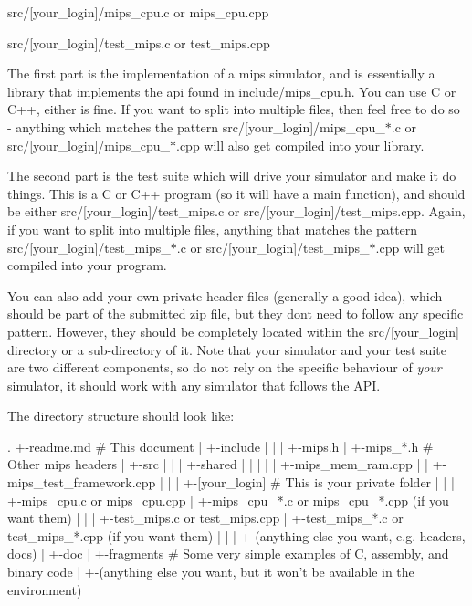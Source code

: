 \begin{DoxyItemize}
\item {\ttfamily src/\mbox{[}your\+\_\+login\mbox{]}/mips\+\_\+cpu.c} or {\ttfamily mips\+\_\+cpu.\+cpp}
\item {\ttfamily src/\mbox{[}your\+\_\+login\mbox{]}/test\+\_\+mips.c} or {\ttfamily test\+\_\+mips.\+cpp}
\end{DoxyItemize}

The first part is the implementation of a mips simulator, and is essentially a library that implements the api found in include/mips\+\_\+cpu.\+h. You can use C or C++, either is fine. If you want to split into multiple files, then feel free to do so -\/ anything which matches the pattern {\ttfamily src/\mbox{[}your\+\_\+login\mbox{]}/mips\+\_\+cpu\+\_\+$\ast$.c} or {\ttfamily src/\mbox{[}your\+\_\+login\mbox{]}/mips\+\_\+cpu\+\_\+$\ast$.cpp} will also get compiled into your library.

The second part is the test suite which will drive your simulator and make it do things. This is a C or C++ program (so it will have a main function), and should be either {\ttfamily src/\mbox{[}your\+\_\+login\mbox{]}/test\+\_\+mips.c} or {\ttfamily src/\mbox{[}your\+\_\+login\mbox{]}/test\+\_\+mips.cpp}. Again, if you want to split into multiple files, anything that matches the pattern {\ttfamily src/\mbox{[}your\+\_\+login\mbox{]}/test\+\_\+mips\+\_\+$\ast$.c} or {\ttfamily src/\mbox{[}your\+\_\+login\mbox{]}/test\+\_\+mips\+\_\+$\ast$.cpp} will get compiled into your program.

You can also add your own private header files (generally a good idea), which should be part of the submitted zip file, but they don\textquotesingle{}t need to follow any specific pattern. However, they should be completely located within the {\ttfamily src/\mbox{[}your\+\_\+login\mbox{]}} directory or a sub-\/directory of it. Note that your simulator and your test suite are two different components, so do not rely on the specific behaviour of {\itshape your} simulator, it should work with any simulator that follows the A\+P\+I.

The directory structure should look like\+: \begin{DoxyVerb}.
+-readme.md  # This document
|
+-include
| |
| +-mips.h
| +-mips_*.h  # Other mips headers
|
+-src
| |
| +-shared
| | | 
| | +-mips_mem_ram.cpp
| | +-mips_test_framework.cpp
| |
| +-[your_login] # This is your private folder
|   |
|   +-mips_cpu.c or mips_cpu.cpp
|   +-mips_cpu_*.c or mips_cpu_*.cpp (if you want them)
|   |
|   +-test_mips.c or test_mips.cpp
|   +-test_mips_*.c or test_mips_*.cpp (if you want them)
|   |
|   +-(anything else you want, e.g. headers, docs)
|
+-doc
|
+-fragments # Some very simple examples of C, assembly, and binary code
|
+-(anything else you want, but it won't be available in the environment)
\end{DoxyVerb}


